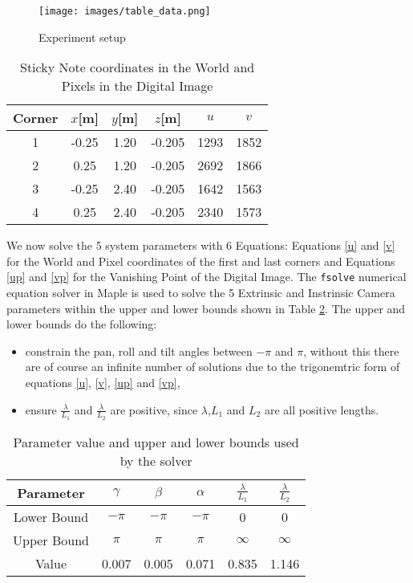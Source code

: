 \documentclass[12pt]{article}
\begin{document}
\begin{figure}[h]
\centering
\texttt{[image: images/table\_data.png]}
\caption{Experiment setup}\label{fig:experiment}
\end{figure}

\begin{table}[!htb]
\begin{center}
\begin{tabular}{ |c|c|c|c|c|c| } 
\hline
Corner & $x$[m] & $y$[m] & $z$[m] &$u$ & $v$\\
\hline
1 & -0.25 & 1.20 &-0.205 & 1293 & 1852 \\
2 & 0.25 & 1.20 & -0.205 & 2692 & 1866 \\
3 & -0.25 & 2.40 & -0.205 & 1642 & 1563 \\
4 & 0.25 & 2.40 & -0.205 & 2340 & 1573\\
\hline
\end{tabular}
\end{center}
\caption{Sticky Note coordinates in the World and Pixels in the Digital Image}
\label{table:1}
\end{table}

We now solve the 5 system parameters with 6 Equations: Equations \ref{u} and \ref{v} for the World and Pixel coordinates of the first and last corners and Equations \ref{up} and \ref{vp} for the Vanishing Point of the Digital Image. 
 The \texttt{fsolve} numerical equation solver in Maple is used to solve the 5 Extrinsic and Instrinsic Camera parameters within the upper and lower bounds shown in Table \ref{table:bounds}. The upper and lower bounds do the following:

\begin{itemize}

\item  constrain the pan, roll and tilt angles between $-\pi$ and $\pi$, without this there are of course an infinite number of solutions due to the trigonemtric form of equations \ref{u}, \ref{v}, \ref{up} and \ref{vp}, 
\item ensure  $\frac{\lambda}{L_1}$  and $\frac{\lambda}{L_2}$ are positive, since $\lambda$,$L_1$ and $L_2$ are all positive lengths.

\end{itemize}

\begin{table}[!htb]
\centering
\begin{tabular}{|c|c|c|c|c|c|}
\hline
Parameter & $\gamma$ & $\beta$ & $\alpha$ & $\frac{\lambda}{L_1}$ & $\frac{\lambda}{L_2}$\\
\hline
Lower Bound & $-\pi$ & $-\pi$ & $-\pi$ & 0 & 0 \\ 
Upper Bound & $\pi$ & $\pi$ & $\pi$ & $\infty$ & $\infty$ \\
Value & 0.007 & 0.005 & 0.071 & 0.835 & 1.146 \\
\hline
\end{tabular}
\caption{Parameter value and upper and lower bounds used by the solver}
\label{table:bounds}
\end{table}
\end{document}
